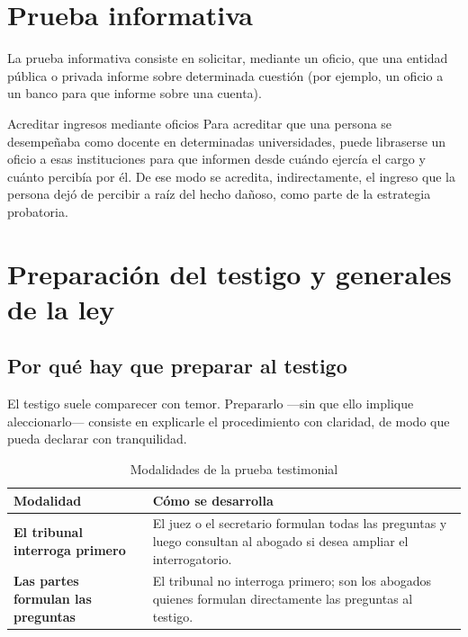 \documentclass[12pt,oneside]{book}
\begin{document}
\section{Prueba informativa}

La prueba informativa consiste en solicitar, mediante un oficio, que una entidad pública o privada informe sobre determinada cuestión (por ejemplo, un oficio a un banco para que informe sobre una cuenta).

\begin{example}{Acreditar ingresos mediante oficios}
Para acreditar que una persona se desempeñaba como docente en determinadas universidades, puede libraserse un oficio a esas instituciones para que informen desde cuándo ejercía el cargo y cuánto percibía por él. De ese modo se acredita, indirectamente, el ingreso que la persona dejó de percibir a raíz del hecho dañoso, como parte de la estrategia probatoria.
\end{example}

\section{Preparación del testigo y generales de la ley}

\subsection{Por qué hay que preparar al testigo}

El testigo suele comparecer con temor. Prepararlo —sin que ello implique aleccionarlo— consiste en explicarle el procedimiento con claridad, de modo que pueda declarar con tranquilidad.

\begin{table}[H]
\centering
\caption{Modalidades de la prueba testimonial}
\begin{tabularx}{\textwidth}{>{\raggedright\arraybackslash}p{} X}
\toprule
\textbf{Modalidad} & \textbf{Cómo se desarrolla} \\
\midrule
\textbf{El tribunal interroga primero} & El juez o el secretario formulan todas las preguntas y luego consultan al abogado si desea ampliar el interrogatorio. \\
\textbf{Las partes formulan las preguntas} & El tribunal no interroga primero; son los abogados quienes formulan directamente las preguntas al testigo. \\
\bottomrule
\end{tabularx}
\end{table}
\end{document}
